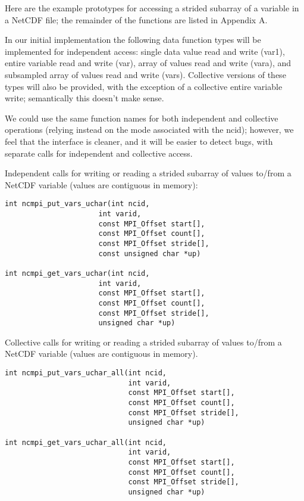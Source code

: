 \documentclass[10pt]{article}
\begin{document}
Here are the example prototypes for accessing a strided subarray of a variable
in a NetCDF file; the remainder of the functions are listed in Appendix A.

In our initial implementation the following data function types will be
implemented for independent access: single data value read and write (var1),
entire variable read and write (var), array of values read and write (vara),
and subsampled array of values read and write (vars).  Collective versions of
these types will also be provided, with the exception of a collective entire
variable write; semantically this doesn't make sense.

We could use the same function names for both independent and collective
operations (relying instead on the mode associated with the ncid); however, we
feel that the interface is cleaner, and it will be easier to detect bugs, with
separate calls for independent and collective access.

%
Independent calls for writing or reading a strided subarray of values to/from
a NetCDF variable (values are contiguous in memory):
\begin{verbatim}
int ncmpi_put_vars_uchar(int ncid, 
                      int varid, 
                      const MPI_Offset start[],
                      const MPI_Offset count[], 
                      const MPI_Offset stride[],
                      const unsigned char *up)

int ncmpi_get_vars_uchar(int ncid, 
                      int varid, 
                      const MPI_Offset start[],
                      const MPI_Offset count[], 
                      const MPI_Offset stride[],
                      unsigned char *up)
\end{verbatim}

Collective calls for writing or reading a strided subarray of values to/from a
NetCDF variable (values are contiguous in memory).
\begin{verbatim}
int ncmpi_put_vars_uchar_all(int ncid, 
                             int varid, 
                             const MPI_Offset start[],
                             const MPI_Offset count[], 
                             const MPI_Offset stride[],
                             unsigned char *up)

int ncmpi_get_vars_uchar_all(int ncid, 
                             int varid, 
                             const MPI_Offset start[],
                             const MPI_Offset count[],
                             const MPI_Offset stride[],
                             unsigned char *up)
\end{verbatim}
\end{document}
